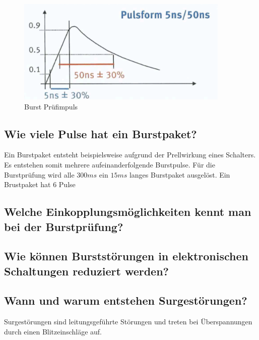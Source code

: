 \begin{figure}
  \centering
  \includegraphics[height=5cm]{src/assets/pictures/lv4_burst_impuls.png}
  \caption{Burst Prüfimpuls}\label{fig:lv4:burst_impuls}
\end{figure}

\subsection{Wie viele Pulse hat ein Burstpaket?}
Ein Burstpaket entsteht beispielsweise aufgrund der Prellwirkung eines Schalters. Es entstehen somit mehrere aufeinanderfolgende Burstpulse.\p
Für die Burstprüfung wird alle \(300ms\) ein \(15ms\) langes Burstpaket ausgelöst. Ein Brustpaket hat \(6\) Pulse

\subsection{Welche Einkopplungsmöglichkeiten kennt man bei der Burstprüfung?}

\subsection{Wie können Burststörungen in elektronischen Schaltungen reduziert werden?}

\subsection{Wann und warum entstehen Surgestörungen?}
Surgestörungen sind leitungsgeführte Störungen und treten bei Überspannungen durch einen Blitzeinschläge auf. 

